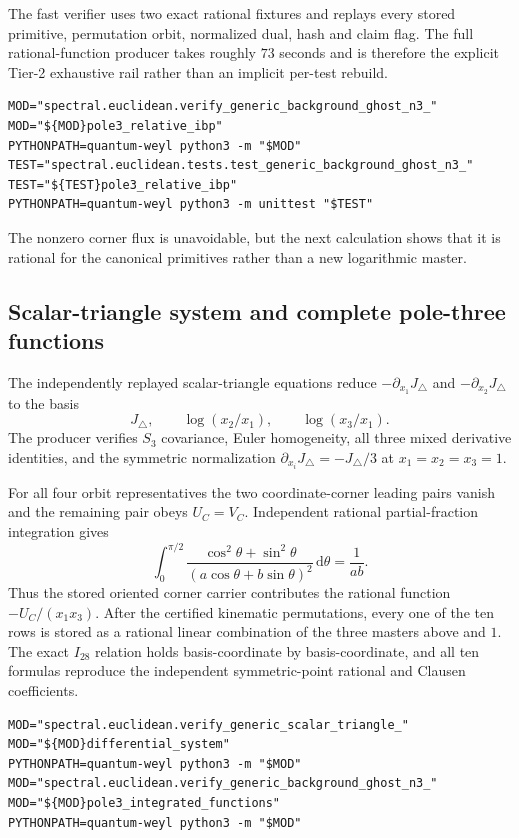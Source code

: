 \documentclass[11pt]{article}
\theoremstyle{definition}
\theoremstyle{remark}
\newcommand{\dd}{\mathrm d}
\begin{document}
The fast verifier uses two exact rational fixtures and replays every stored
primitive, permutation orbit, normalized dual, hash and claim flag.  The
full rational-function producer takes roughly $73$ seconds and is therefore
the explicit Tier-2 exhaustive rail rather than an implicit per-test rebuild.

\begin{verbatim}
MOD="spectral.euclidean.verify_generic_background_ghost_n3_"
MOD="${MOD}pole3_relative_ibp"
PYTHONPATH=quantum-weyl python3 -m "$MOD"
TEST="spectral.euclidean.tests.test_generic_background_ghost_n3_"
TEST="${TEST}pole3_relative_ibp"
PYTHONPATH=quantum-weyl python3 -m unittest "$TEST"
\end{verbatim}

The nonzero corner flux is unavoidable, but the next calculation shows that
it is rational for the canonical primitives rather than a new logarithmic
master.

\subsection{Scalar-triangle system and complete pole-three functions}

The independently replayed scalar-triangle equations reduce
$-\partial_{x_1}J_\triangle$ and $-\partial_{x_2}J_\triangle$ to the basis
\[
 J_\triangle,\qquad \log(x_2/x_1),\qquad \log(x_3/x_1).
\]
The producer verifies $S_3$ covariance, Euler homogeneity, all three mixed
derivative identities, and the symmetric normalization
$\partial_{x_i}J_\triangle=-J_\triangle/3$ at $x_1=x_2=x_3=1$.

For all four orbit representatives the two coordinate-corner leading pairs
vanish and the remaining pair obeys $U_C=V_C$.  Independent rational
partial-fraction integration gives
\[
 \int_0^{\pi/2}
 \frac{\cos^2\theta+\sin^2\theta}
 {(a\cos\theta+b\sin\theta)^2}\,\dd\theta=\frac1{ab}.
\]
Thus the stored oriented corner carrier contributes the rational function
$-U_C/(x_1x_3)$.  After the certified kinematic permutations, every one of
the ten rows is stored as a rational linear combination of the three masters
above and $1$.  The exact $I_{28}$ relation holds basis-coordinate by
basis-coordinate, and all ten formulas reproduce the independent
symmetric-point rational and Clausen coefficients.

\begin{verbatim}
MOD="spectral.euclidean.verify_generic_scalar_triangle_"
MOD="${MOD}differential_system"
PYTHONPATH=quantum-weyl python3 -m "$MOD"
MOD="spectral.euclidean.verify_generic_background_ghost_n3_"
MOD="${MOD}pole3_integrated_functions"
PYTHONPATH=quantum-weyl python3 -m "$MOD"
\end{verbatim}
\end{document}
